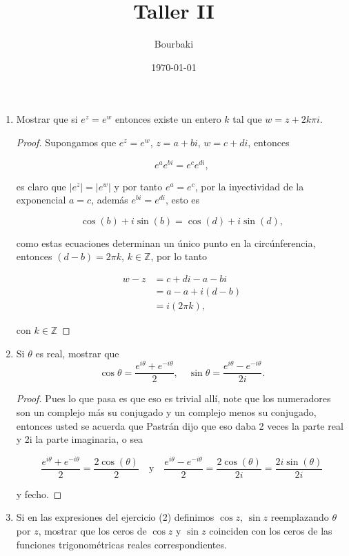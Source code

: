 \documentclass[11pt]{article}
\title{Taller II}
\author{Bourbaki}
\date{\today}
\begin{document}
\maketitle

\begin{enumerate}
    \item Mostrar que si $e^z = e^w$ entonces existe un entero $k$ tal que $w = z + 2k\pi i$.\\

    \begin{proof}
    Supongamos que $e^z=e^w$, $z=a+bi$, $w=c+di$, entonces

    $$e^{a}e^{bi}=e^{c}e^{di},$$

    es claro que $|e^z|=|e^w|$ y por tanto $e^a=e^c$, por la inyectividad de la exponencial $a=c$, además $e^{bi}=e^{di}$, esto es

    $$\cos(b)+i\sin(b)=\cos(d)+i\sin(d),$$ 

    como estas ecuaciones determinan un único punto en la circúnferencia, entonces $(d-b)=2\pi k$, $k\in \mathbb{Z}$, por lo tanto

    \begin{align*}
      w-z&=c+di-a-bi\\
        &=a-a+i(d-b)\\
        &=i(2\pi k)
    ,\end{align*}

con $k\in \mathbb{Z}$

    \end{proof}

    \item Si $\theta$ es real, mostrar que
    \[
    \cos \theta = \frac{e^{i \theta} + e^{-i \theta}}{2}, \quad \sin \theta = \frac{e^{i \theta} - e^{-i \theta}}{2i}.
    \]

    \begin{proof}
    Pues lo que pasa es que eso es trivial allí, note que los numeradores son un complejo más su conjugado y un complejo menos su conjugado, entonces usted se acuerda que Pastrán dijo que eso daba 2 veces la parte real y 2i la parte imaginaria,  o sea

    $$\frac{e^{i\theta}+e^{-i\theta}}{2}=\frac{2\cos(\theta)}{2} \quad \text{y}\quad \frac{e^{i\theta}-e^{-i\theta}}{2}=\frac{2\cos(\theta)}{2i}=\frac{2i\sin(\theta)}{2i}$$

    y fecho.
    \end{proof}

    \item Si en las expresiones del ejercicio (2) definimos $\cos z$, $\sin z$ reemplazando $\theta$ por $z$, mostrar que los ceros de $\cos z$ y $\sin z$ coinciden con los ceros de las funciones trigonométricas reales correspondientes.


\end{enumerate}
\end{document}
